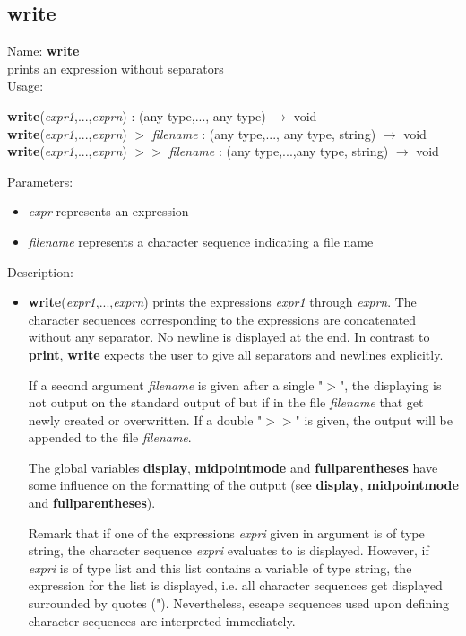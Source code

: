 \subsection{write}
\label{labwrite}
\noindent Name: \textbf{write}\\
prints an expression without separators\\
\noindent Usage: 
\begin{center}
\textbf{write}(\emph{expr1},...,\emph{exprn}) : (\textsf{any type},..., \textsf{any type}) $\rightarrow$ \textsf{void}\\
\textbf{write}(\emph{expr1},...,\emph{exprn}) $>$ \emph{filename} : (\textsf{any type},..., \textsf{any type}, \textsf{string}) $\rightarrow$ \textsf{void}\\
\textbf{write}(\emph{expr1},...,\emph{exprn}) $>>$ \emph{filename} : (\textsf{any type},...,\textsf{any type}, \textsf{string}) $\rightarrow$ \textsf{void}\\
\end{center}
Parameters: 
\begin{itemize}
\item \emph{expr} represents an expression
\item \emph{filename} represents a character sequence indicating a file name
\end{itemize}
\noindent Description: \begin{itemize}

\item \textbf{write}(\emph{expr1},...,\emph{exprn}) prints the expressions \emph{expr1} through
   \emph{exprn}. The character sequences corresponding to the expressions are
   concatenated without any separator. No newline is displayed at the
   end.  In contrast to \textbf{print}, \textbf{write} expects the user to give all
   separators and newlines explicitly.
    
   If a second argument \emph{filename} is given after a single "$>$", the
   displaying is not output on the standard output of \sollya but if in
   the file \emph{filename} that get newly created or overwritten. If a double
    "$>>$" is given, the output will be appended to the file \emph{filename}.
    
   The global variables \textbf{display}, \textbf{midpointmode} and \textbf{fullparentheses} have
   some influence on the formatting of the output (see \textbf{display},
   \textbf{midpointmode} and \textbf{fullparentheses}).
    
   Remark that if one of the expressions \emph{expri} given in argument is of
   type \textsf{string}, the character sequence \emph{expri} evaluates to is
   displayed. However, if \emph{expri} is of type \textsf{list} and this list
   contains a variable of type \textsf{string}, the expression for the list
   is displayed, i.e.  all character sequences get displayed surrounded
   by quotes ("). Nevertheless, escape sequences used upon defining
   character sequences are interpreted immediately.
\end{itemize}
